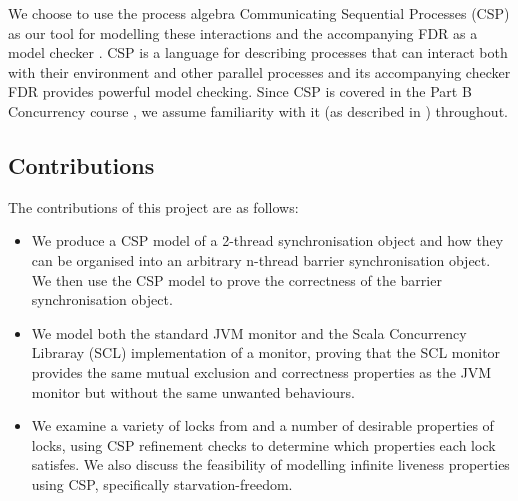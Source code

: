 We choose to use the process algebra Communicating Sequential Processes (CSP) \cite{RoscoeUCS} as our tool for modelling these interactions and the accompanying FDR as a model checker \cite{FDR}. CSP is a language for describing processes that can interact both with their environment and other parallel processes and its accompanying checker FDR provides powerful model checking. Since CSP is covered in the Part B Concurrency course \cite{Concurrency}, we assume familiarity with it (as described in \cite{RoscoeUCS}) throughout.



\subsection{Contributions}

The contributions of this project are as follows:

\begin{itemize}
  \item We produce a CSP model of a 2-thread synchronisation object and how they can be organised into an arbitrary n-thread barrier synchronisation object. We then use the CSP model to prove the correctness of the barrier synchronisation object.
  \item We model both the standard JVM monitor and the Scala Concurrency Libraray (SCL) \cite{CP} implementation of a monitor, proving that the SCL monitor provides the same mutual exclusion and correctness properties as the JVM monitor but without the same unwanted behaviours.
  \item We examine a variety of locks from \cite{CADS} and a number of desirable properties of locks, using CSP refinement checks to determine which properties each lock satisfes. We also discuss the feasibility of modelling infinite liveness properties using CSP, specifically starvation-freedom.
\end{itemize}



